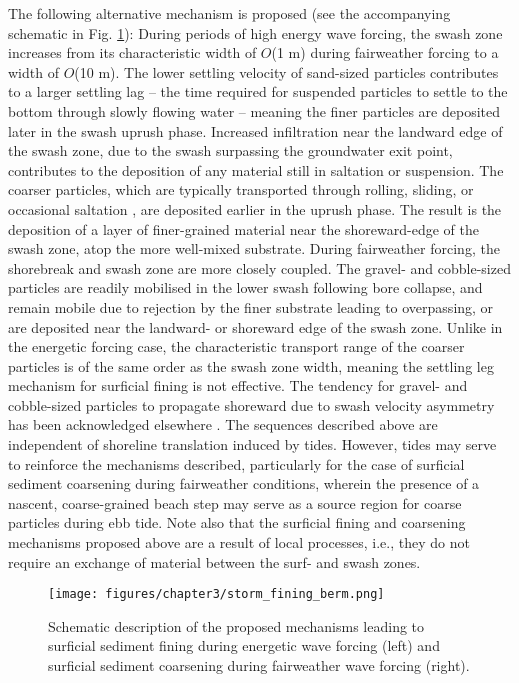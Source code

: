 \documentclass[preprint,12pt,authoryear]{elsarticle}
\begin{document}
The following alternative mechanism is proposed (see the accompanying schematic in Fig. \ref{fig:storm_fining}): During periods of high energy wave forcing, the swash zone increases from its characteristic width of $O$(1 m) during fairweather forcing to a width of $O$(10 m). The lower settling velocity of sand-sized particles contributes to a larger settling lag -- the time required for suspended particles to settle to the bottom through slowly flowing water \citep{Masselink_Puleo2006} -- meaning the finer particles are deposited later in the swash uprush phase. Increased infiltration near the landward edge of the swash zone, due to the swash surpassing the groundwater exit point, contributes to the deposition of any material still in saltation or suspension. The coarser particles, which are typically transported through rolling, sliding, or occasional saltation \citep{Carter_Orford1984}, are deposited earlier in the uprush phase. The result is the deposition of a layer of finer-grained material near the shoreward-edge of the swash zone, atop the more well-mixed substrate. During fairweather forcing, the shorebreak and swash zone are more closely coupled. The gravel- and cobble-sized particles are readily mobilised in the lower swash following bore collapse, and remain mobile due to rejection by the finer substrate leading to overpassing, or are deposited near the landward- or shoreward edge of the swash zone. Unlike in the energetic forcing case, the characteristic transport range of the coarser particles is of the same order as the swash zone width, meaning the settling leg mechanism for surficial fining is not effective. The tendency for gravel- and cobble-sized particles to propagate shoreward due to swash velocity asymmetry has been acknowledged elsewhere \citep{Carr1983}. The sequences described above are independent of shoreline translation induced by tides. However, tides may serve to reinforce the mechanisms described, particularly for the case of surficial sediment coarsening during fairweather conditions, wherein the presence of a nascent, coarse-grained beach step may serve as a source region for coarse particles during ebb tide. Note also that the surficial fining and coarsening mechanisms proposed above are a result of local processes, i.e., they do not require an exchange of material between the surf- and swash zones.

\begin{figure}[tbp] %
	\begin{center}
		\texttt{[image: figures/chapter3/storm\_fining\_berm.png]}
		\caption[Schematic description of surficial sediment fining mechanisms during energetic wave forcing]{Schematic description of the proposed mechanisms leading to surficial sediment fining during energetic wave forcing (left) and surficial sediment coarsening during fairweather wave forcing (right).}
		\label{fig:storm_fining}
	\end{center}
\end{figure}
\end{document}
